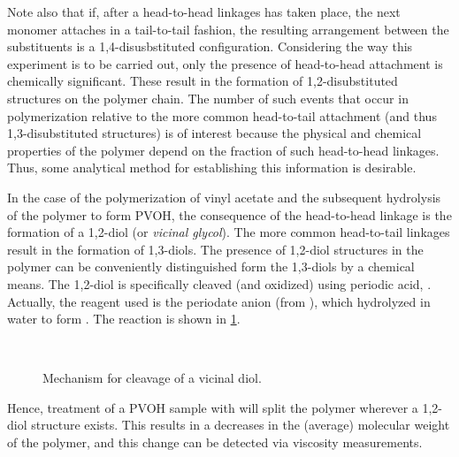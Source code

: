 \documentclass[nobib,nofonts,nols,nohyper]{tufte-handout}
\begin{document}
Note also that if, after a head-to-head linkages has taken place, the next monomer attaches in a tail-to-tail fashion, the resulting arrangement between the substituents is a 1,4-disusbstituted configuration. 
Considering the way this experiment is to be carried out, only the presence of head-to-head attachment is chemically significant. 
These result in the formation of 1,2-disubstituted structures on the polymer chain. The number of such events that occur in polymerization relative to the more common head-to-tail attachment (and thus 1,3-disubstituted structures) is of interest because the physical and chemical properties of the polymer depend on the fraction of such head-to-head linkages. 
Thus, some analytical method for establishing this information is desirable. 

In the case of the polymerization of vinyl acetate and the subsequent hydrolysis of the polymer to form PVOH, the consequence of the head-to-head linkage is the formation of a 1,2-diol (or \emph{vicinal glycol}). 
The more common head-to-tail linkages result in the formation of 1,3-diols. 
The presence of 1,2-diol structures in the polymer can be conveniently distinguished form the 1,3-diols by a chemical means. 
The 1,2-diol is specifically cleaved (and oxidized) using periodic acid, . 
Actually, the reagent used is the periodate anion (from ), which hydrolyzed in water to form .
The reaction is shown in \cref{fig:diol_cleavage}. 
\begin{figure}[htb]
	 \\
	\caption{Mechanism for cleavage of a vicinal diol.}
	\label{fig:diol_cleavage}
\end{figure}
Hence, treatment of a PVOH sample with  will split the polymer wherever a 1,2-diol structure exists. 
This results in a decreases in the (average) molecular weight of the polymer, and this change can be detected via viscosity measurements. 
\end{document}
